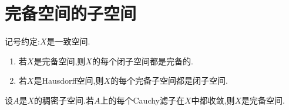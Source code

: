 \section{完备空间的子空间}

记号约定:$X$是一致空间.

\begin{proposition}{}{}
	\begin{enumerate}
		\item 若$X$是完备空间,则$X$的每个闭子空间都是完备的.
		\item 若$X$是Hausdorff空间,则$X$的每个完备子空间都是闭子空间.
	\end{enumerate}
\end{proposition}

\begin{proposition}{}{}
	设$A$是$X$的稠密子空间.若$A$上的每个Cauchy滤子在$X$中都收敛,则$X$是完备空间.
\end{proposition}